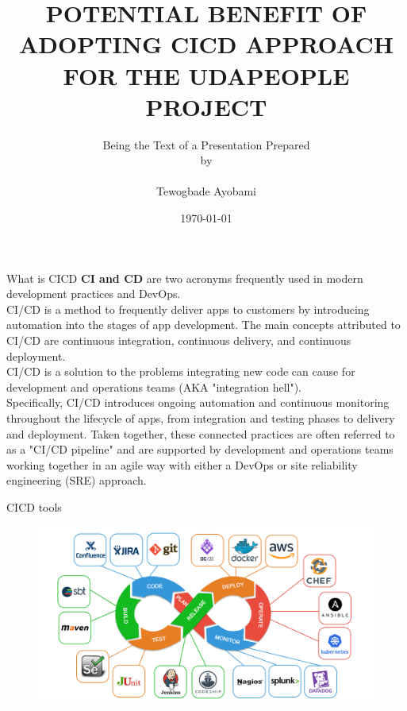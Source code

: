 \documentclass{beamer}
\title[Tewogbade Ayobami]{POTENTIAL BENEFIT OF ADOPTING CICD APPROACH FOR THE UDAPEOPLE PROJECT}
\author[Adopting CICD]{Being the Text of a Presentation Prepared\\ by \\~\\ Tewogbade Ayobami}
\institute[]{For Udacity Devops Nanodegree Project 3 submission}
\date{\today}
\begin{document}
\begin{frame}
\titlepage %
\end{frame}

\begin{frame}{What is CICD}
	\textbf{CI and CD} are two acronyms frequently used in modern development practices and DevOps.\\
	
	CI/CD is a method to frequently deliver apps to customers by introducing automation into the stages of app development. The main concepts attributed to CI/CD are continuous integration, continuous delivery, and continuous deployment. \\
	
	CI/CD is a solution to the problems integrating new code can cause for development and operations teams (AKA "integration hell"). \\
	
	Specifically, CI/CD introduces ongoing automation and continuous monitoring throughout the lifecycle of apps, from integration and testing phases to delivery and deployment. Taken together, these connected practices are often referred to as a "CI/CD pipeline" and are supported by development and operations teams working together in an agile way with either a DevOps or site reliability engineering (SRE) approach.
	
\end{frame}

\begin{frame}{CICD tools}
\begin{figure}
	\centering
	\includegraphics[width=0.9\linewidth]{cicd}
	\caption{}
	\label{fig:cicd}
\end{figure}

\end{frame}
\end{document}

